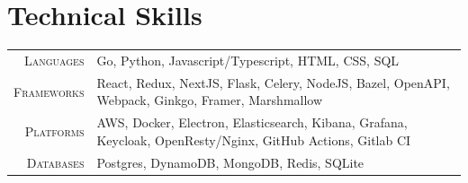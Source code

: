 \documentclass[a4paper,10pt]{extarticle} %
\begin{document}

\section{\textcolor{primary}{Technical Skills}}
\begin{tabularx}{\linewidth}{r|X}
\textsc{Languages} & Go, Python, Javascript/Typescript, HTML, CSS, SQL\\
\textsc{Frameworks} & React, Redux, NextJS, Flask, Celery, NodeJS, Bazel, OpenAPI, Webpack, Ginkgo, Framer, Marshmallow\\
\textsc{Platforms} & AWS, Docker, Electron, Elasticsearch, Kibana, Grafana, Keycloak, OpenResty/Nginx, GitHub Actions, Gitlab CI\\
\textsc{Databases} & Postgres, DynamoDB, MongoDB, Redis, SQLite
\end{tabularx}
\end{document}
